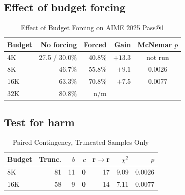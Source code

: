 \documentclass[conference]{IEEEtran}
\newif\ifdraft
\newcommand{\writehere}[2]{%
  \ifdraft
    {\color{orange!75!black}\small\textbf{[WRITE: #1]}\itshape\ #2\par}
    \medskip
  \fi}
\begin{document}
\subsection{Effect of budget forcing}

\begin{table}[t]
\caption{Effect of Budget Forcing on AIME 2025 Pass@1}
\label{tab:main}
\centering
\footnotesize
\begin{tabular}{@{}lrrrc@{}}
\toprule
\textbf{Budget} & \textbf{No forcing} & \textbf{Forced} & \textbf{Gain} &
\textbf{McNemar $p$} \\
\midrule
4K  & 27.5 / 30.0\% & 40.8\% & $+13.3$ & not run \\
8K  & 46.7\%        & 55.8\% & $+9.1$  & $\mathbf{0.0026}$ \\
16K & 63.3\%        & 70.8\% & $+7.5$  & $\mathbf{0.0077}$ \\
32K & 80.8\%        & n/m    &         & \\
\bottomrule
\end{tabular}
\end{table}

\writehere{1 paragraph}{
The gain is significant at every budget where the paired test could be applied.
Explain the two baselines in the 4K row honestly: that budget was measured twice,
once by a dedicated run at 27.5 percent and once by truncating traces at 30.0
percent. Three samples apart, within noise, but different experiments, so they
should not be plotted as one series.}

\subsection{Test for harm}

\begin{table}[t]
\caption{Paired Contingency, Truncated Samples Only}
\label{tab:paired}
\centering
\footnotesize
\begin{tabular}{@{}lrrrrrr@{}}
\toprule
\textbf{Budget} & \textbf{Trunc.} & \textbf{$b$} & \textbf{$c$} &
\textbf{r$\rightarrow$r} & \textbf{$\chi^2$} & \textbf{$p$} \\
\midrule
8K  & 81 & 11 & \textbf{0} & 17 & 9.09 & 0.0026 \\
16K & 58 & 9  & \textbf{0} & 14 & 7.11 & 0.0077 \\
\bottomrule
\end{tabular}
\end{table}

\writehere{1 paragraph, factual}{
Across 139 interventions $c$ equals zero. Note that 31 truncated traces already
contained a correct boxed expression and forcing re derived the identical value
for every one. Save the explanation for Section VI.}
\end{document}
